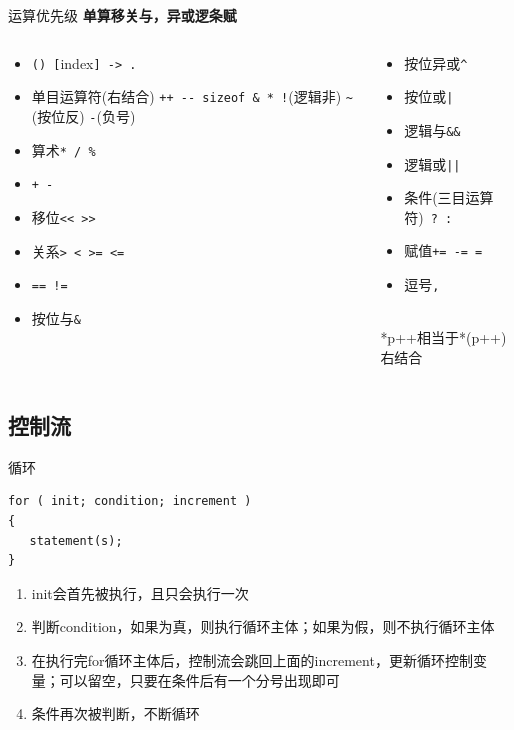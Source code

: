 \documentclass[UTF8]{ctexbeamer}
\begin{document}
\begin{frame}[fragile]{运算优先级}
{\Large\textbf{单算移关与，异或逻条赋}}
\begin{columns}
\begin{column}{0.5\linewidth}
\begin{itemize}
	\item \verb'() ['index\verb'] -> .'
	\item 单目运算符(右结合) \verb'++ -- sizeof & * !'(逻辑非) \verb'~'(按位反) \verb'-'(负号)
	\item 算术\verb'* / %'
	\item \verb'+ -'
	\item 移位\verb'<< >>'
	\item 关系\verb'> < >= <='
	\item \verb'== !='
	\item 按位与\verb'&'
\end{itemize}
\end{column}
\begin{column}{0.5\linewidth}
\begin{itemize}
	\item 按位异或\verb'^'
	\item 按位或\verb'|'
	\item 逻辑与\verb'&&'
	\item 逻辑或\verb'||'
	\item 条件(三目运算符)\verb' ? :' 
	\item 赋值\verb'+= -= ='
	\item 逗号\verb','
\end{itemize}
\quad\\
*p++相当于*(p++)右结合
\end{column}
\end{columns}
\end{frame}

\subsection{控制流}
\begin{frame}
\subsectionpage
\end{frame}

\begin{frame}[fragile]{循环}
\begin{lstlisting}
for ( init; condition; increment )
{
   statement(s);
}
\end{lstlisting}
\begin{enumerate}[<+->]
	\item init会首先被执行，且只会执行一次
	\item 判断condition，如果为真，则执行循环主体；如果为假，则不执行循环主体
	\item 在执行完for循环主体后，控制流会跳回上面的increment，更新循环控制变量；可以留空，只要在条件后有一个分号出现即可
	\item 条件再次被判断，不断循环
\end{enumerate}
\end{frame}
\end{document}

